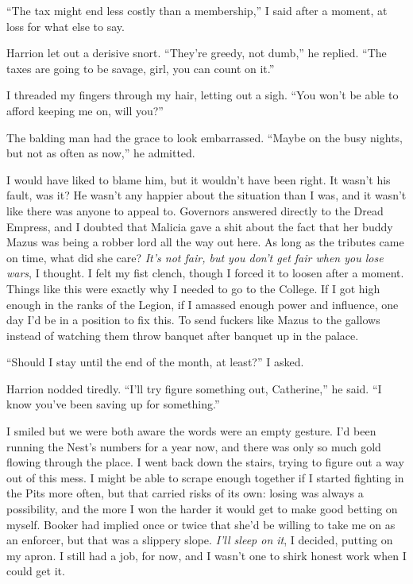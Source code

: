 \documentclass[12pt, openany]{book}
\begin{document}
“The tax might end less costly than a membership,” I said after a moment, at loss for what else to say.

Harrion let out a derisive snort. “They’re greedy, not dumb,” he replied. “The taxes are going to be savage, girl, you can count on it.”

I threaded my fingers through my hair, letting out a sigh. “You won’t be able to afford keeping me on, will you?”

The balding man had the grace to look embarrassed. “Maybe on the busy nights, but not as often as now,” he admitted.

I would have liked to blame him, but it wouldn’t have been right. It wasn’t his fault, was it? He wasn’t any happier about the situation than I was, and it wasn’t like there was anyone to appeal to. Governors answered directly to the Dread Empress, and I doubted that Malicia gave a shit about the fact that her buddy Mazus was being a robber lord all the way out here. As long as the tributes came on time, what did she care? \textit{It’s not fair, but you don’t get fair when you lose wars}, I thought. I felt my fist clench, though I forced it to loosen after a moment. Things like this were exactly why I needed to go to the College. If I got high enough in the ranks of the Legion, if I amassed enough power and influence, one day I’d be in a position to fix this. To send fuckers like Mazus to the gallows instead of watching them throw banquet after banquet up in the palace.

“Should I stay until the end of the month, at least?” I asked.

Harrion nodded tiredly. “I’ll try figure something out, Catherine,” he said. “I know you’ve been saving up for something.”

I smiled but we were both aware the words were an empty gesture. I’d been running the Nest’s numbers for a year now, and there was only so much gold flowing through the place. I went back down the stairs, trying to figure out a way out of this mess. I might be able to scrape enough together if I started fighting in the Pits more often, but that carried risks of its own: losing was always a possibility, and the more I won the harder it would get to make good betting on myself. Booker had implied once or twice that she’d be willing to take me on as an enforcer, but that was a slippery slope. \textit{I’ll sleep on it}, I decided, putting on my apron. I still had a job, for now, and I wasn’t one to shirk honest work when I could get it.
\end{document}
